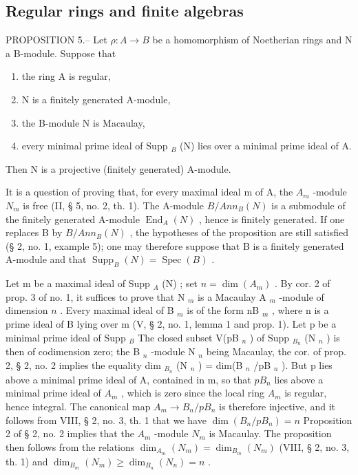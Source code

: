 \subsection{Regular rings and finite algebras}

PROPOSITION 5.-- Let \(\rho: A \to B\) be a homomorphism of Noetherian rings and N a B-module. Suppose that

\begin{enumerate}
\def\labelenumi{\alph{enumi})}
\item
  the ring A is regular,
\item
  N is a finitely generated A-module,
\item
  the B-module N is Macaulay,
\item
  every minimal prime ideal of Supp \(_{B}\) (N) lies over a minimal prime ideal of A.
\end{enumerate}

Then N is a projective (finitely generated) A-module.

It is a question of proving that, for every maximal ideal m of A, the \(A_{m}\) -module \(N_{m}\) is free (II, § 5, no. 2, th. 1). The A-module \(B/Ann_{B}(N)\) is a submodule of the finitely generated A-module \(\operatorname{End}_{A}(N)\) , hence is finitely generated. If one replaces B by \(B/Ann_{B}(N)\) , the hypotheses of the proposition are still satisfied (§ 2, no. 1, example 5); one may therefore suppose that B is a finitely generated A-module and that \(\operatorname{Supp}_{B}(N) = \operatorname{Spec}(B)\) .

Let m be a maximal ideal of Supp \(_A\) (N) ; set \(n = \dim(A_m)\) . By cor. 2 of prop. 3 of no. 1, it suffices to prove that N \(_m\) is a Macaulay A \(_m\) -module of dimension \(n\) . Every maximal ideal of B \(_m\) is of the form nB \(_m\) , where n is a prime ideal of B lying over m (V, § 2, no. 1, lemma 1 and prop. 1). Let p be a minimal prime ideal of Supp \(_B\) The closed subset V(pB \(_n\) ) of Supp \(_{B_n}\) (N \(_n\) ) is then of codimension zero; the B \(_n\) -module N \(_n\) being Macaulay, the cor. of prop. 2, § 2, no. 2 implies the equality dim \(_{B_n}\) (N \(_n\) ) = dim(B \(_n\) /pB \(_n\) ). But p lies above a minimal prime ideal of A, contained in m, so that \(pB_{n}\) lies above a minimal prime ideal of \(A_{m}\) , which is zero since the local ring \(A_{m}\) is regular, hence integral. The canonical map \(A_{m} \to B_{n}/pB_{n}\) is therefore injective, and it follows from VIII, § 2, no. 3, th. 1 that we have \(\dim(B_{n}/pB_{n}) = n\) Proposition 2 of § 2, no. 2 implies that the \(A_{m}\) -module \(N_{m}\) is Macaulay. The proposition then follows from the relations \(\dim_{A_{m}}(N_{m}) = \dim_{B_{m}}(N_{m})\) (VIII, § 2, no. 3, th. 1) and \(\dim_{B_{m}}(N_{m}) \geqslant \dim_{B_{n}}(N_{n}) = n\) .

